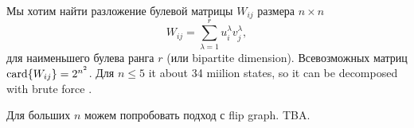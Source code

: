 Мы хотим найти разложение булевой матрицы $W_{ij}$ размера $n\times n$
\begin{equation*}
	W_{ij} = \sum_{\lambda=1}^r u^\lambda_i v^\lambda_j,
\end{equation*}
для наименьшего булева ранга $r$ (или bipartite dimension). Всевозможных матриц $\mathop{\mathrm{card}}\nolimits\{W_{ij}\} = 2^{n^2}$. Для $n \leq 5$ it about 34 miilion states, so it can be decomposed with brute force . 

Для больших $n$ можем попробовать подход с flip graph. TBA. 



